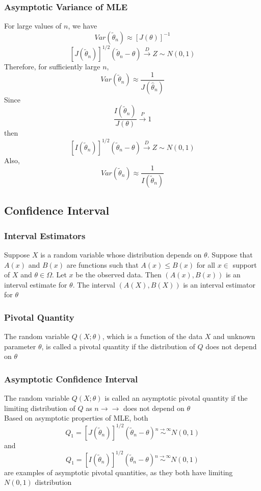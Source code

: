 \documentclass[11pt]{article}
\begin{document}
\subsubsection{Asymptotic Variance of MLE}
For large values of $n$, we have 
\[Var(\tilde{\theta}_n)\approx[J(\theta)]^{-1}\]
\[[J(\tilde{\theta}_n)]^{1/2}(\tilde{\theta}_n-\theta)\overset{D}{\rightarrow}Z\sim N(0,1)\]
Therefore, for sufficiently large $n$, 
\[Var(\tilde{\theta}_n)\approx\frac{1}{J(\hat\theta_n)}\]
Since \[\frac{I(\tilde{\theta}_n)}{J(\theta)}\overset{P}{\rightarrow}1\]
then \[[I(\tilde{\theta}_n)]^{1/2}(\tilde{\theta}_n-\theta)\overset{D}{\rightarrow}Z\sim N(0,1)\]
Also, \[Var(\tilde{\theta}_n)\approx\frac{1}{I(\tilde{\theta}_n)}\]
\subsection{Confidence Interval}
\subsubsection{Interval Estimators}
Suppose $X$ is a random variable whose distribution depends on $\theta$. Suppose that $A(x)$ and $B(x)$ are functions such that $A(x)\leq B(x)$
for all $x\in$ support of $X$ and $\theta\in\Omega$. Let $x$ be the observed data. Then $(A(x),B(x))$ is an interval estimate for $\theta$. The 
interval $(A(X),B(X))$ is an interval estimator for $\theta$ 
\subsubsection{Pivotal Quantity}
The random variable $Q(X;\theta)$, which is a function of the data $X$ and unknown parameter $\theta$, is called a pivotal quantity if 
the distribution of $Q$ does not depend on $\theta$
\subsubsection{Asymptotic Confidence Interval}
The random variable $Q(X;\theta)$ is called an asymptotic pivotal quantity if the limiting distribution of $Q$ as $n\to\rightarrow$
does not depend on $\theta$ \\
Based on asymptotic properties of MLE, both 
\[Q_1=\left[J(\tilde{\theta}_n)\right]^{1/2}(\tilde{\theta}_n-\theta)\overset{n\to\infty}{\sim}N(0,1)\] 
and 
\[Q_1=\left[I(\tilde{\theta}_n)\right]^{1/2}(\tilde{\theta}_n-\theta)\overset{n\to\infty}{\sim}N(0,1)\]
are examples of asymptotic pivotal quantities, as they both have limiting $N(0,1)$ distribution 
\end{document}
